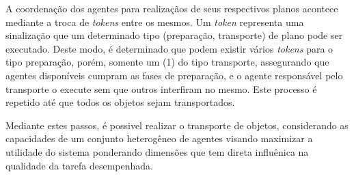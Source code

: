 \documentclass[12pt]{article}
\begin{document}
A coordenação dos agentes para realizaçãos de seus respectivos planos acontece mediante a troca de \emph{tokens} entre os mesmos. Um \emph{token} representa uma sinalização que um determinado tipo (preparação, transporte) de plano pode ser executado.
Deste modo, é determinado que podem existir vários \emph{tokens} para o tipo preparação, porém, somente um (1) do tipo transporte, assegurando que agentes disponíveis cumpram as fases de preparação, e o agente responsável pelo transporte o execute sem que outros interfiram no mesmo.
Este processo é repetido até que todos os objetos sejam transportados.

Mediante estes passos, é possivel realizar o transporte de objetos, considerando as capacidades de um conjunto heterogêneo de agentes visando maximizar a utilidade do sistema ponderando dimensões que tem direta influênica na qualidade da tarefa desempenhada.

\nocite{Ahmadabadi2001}
\nocite{Miyata2002}
\nocite{Gerkey2002}
\nocite{Sugar2002}
\nocite{Song2002}
\nocite{Tanner2003}
\nocite{Yamashita2003}
\nocite{Costa2007}
\nocite{Zacharias2007}
\nocite{Shiroma2009}
\nocite{Ozturk2014}
\nocite{Carvalho2013}
\nocite{Fink2008}
\nocite{Gerkey2001}
\nocite{Kim2013}
\nocite{Michael2011}
\nocite{Sujit2013}
\nocite{Tiganas2013}
\nocite{Wawerla2010}

\newpage



\end{document}
